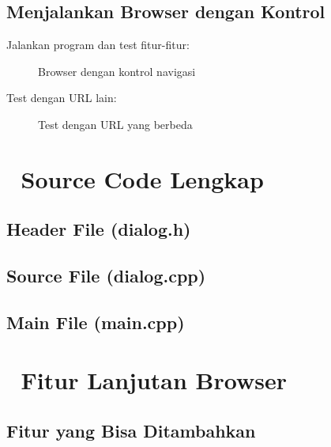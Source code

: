 \subsection{Menjalankan Browser dengan Kontrol}

Jalankan program dan test fitur-fitur:

\begin{figure}[htbp]
\centering
{}
\caption{Browser dengan kontrol navigasi}
\end{figure}

Test dengan URL lain:

\begin{figure}[htbp]
\centering
{}
\caption{Test dengan URL yang berbeda}
\end{figure}

\section{📁 Source Code Lengkap}

\subsection{Header File (dialog.h)}



\subsection{Source File (dialog.cpp)}



\subsection{Main File (main.cpp)}



\section{🔧 Fitur Lanjutan Browser}

\subsection{Fitur yang Bisa Ditambahkan}

